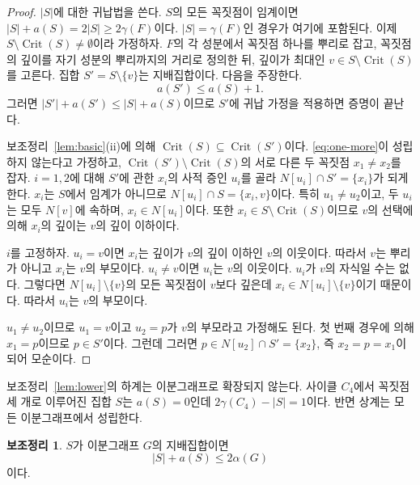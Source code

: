 \documentclass[11pt,a4paper]{article}
\theoremstyle{definition}
\newtheorem{lemma}[theorem]{보조정리}
\newcommand{\Crit}{\operatorname{Crit}}
\begin{document}
\begin{proof}
$|S|$에 대한 귀납법을 쓴다. $S$의 모든 꼭짓점이 임계이면
$|S|+a(S)=2|S|\ge2\gamma(F)$이다. $|S|=\gamma(F)$인 경우가 여기에 포함된다. 이제
$S\setminus\Crit(S)\ne\emptyset$이라 가정하자. $F$의 각 성분에서 꼭짓점 하나를 뿌리로
잡고, 꼭짓점의 깊이를 자기 성분의 뿌리까지의 거리로 정의한 뒤, 깊이가 최대인
$v\in S\setminus\Crit(S)$를 고른다. 집합 $S'=S\setminus\{v\}$는 지배집합이다. 다음을
주장한다.
\begin{equation}\label{eq:one-more}
  a(S')\le a(S)+1 .
\end{equation}
그러면 $|S'|+a(S')\le|S|+a(S)$이므로 $S'$에 귀납 가정을 적용하면 증명이 끝난다.

보조정리~\ref{lem:basic}(ii)에 의해 $\Crit(S)\subseteq\Crit(S')$이다.
\eqref{eq:one-more}이 성립하지 않는다고 가정하고, $\Crit(S')\setminus\Crit(S)$의 서로
다른 두 꼭짓점 $x_1\ne x_2$를 잡자. $i=1,2$에 대해 $S'$에 관한 $x_i$의 사적 증인
$u_i$를 골라 $N[u_i]\cap S'=\{x_i\}$가 되게 한다. $x_i$는 $S$에서 임계가 아니므로
$N[u_i]\cap S=\{x_i,v\}$이다. 특히 $u_1\ne u_2$이고, 두 $u_i$는 모두 $N[v]$에 속하며,
$x_i\in N[u_i]$이다. 또한 $x_i\in S\setminus\Crit(S)$이므로 $v$의 선택에 의해 $x_i$의
깊이는 $v$의 깊이 이하이다.

$i$를 고정하자. $u_i=v$이면 $x_i$는 깊이가 $v$의 깊이 이하인 $v$의 이웃이다. 따라서
$v$는 뿌리가 아니고 $x_i$는 $v$의 부모이다. $u_i\ne v$이면 $u_i$는 $v$의 이웃이다.
$u_i$가 $v$의 자식일 수는 없다. 그렇다면 $N[u_i]\setminus\{v\}$의 모든 꼭짓점이
$v$보다 깊은데 $x_i\in N[u_i]\setminus\{v\}$이기 때문이다. 따라서 $u_i$는 $v$의
부모이다.

$u_1\ne u_2$이므로 $u_1=v$이고 $u_2=p$가 $v$의 부모라고 가정해도 된다. 첫 번째 경우에
의해 $x_1=p$이므로 $p\in S'$이다. 그런데 그러면 $p\in N[u_2]\cap S'=\{x_2\}$, 즉
$x_2=p=x_1$이 되어 모순이다.
\end{proof}

보조정리~\ref{lem:lower}의 하계는 이분그래프로 확장되지 않는다. 사이클 $C_4$에서
꼭짓점 세 개로 이루어진 집합 $S$는 $a(S)=0$인데 $2\gamma(C_4)-|S|=1$이다. 반면 상계는
모든 이분그래프에서 성립한다.

\begin{lemma}\label{lem:upper}
$S$가 이분그래프 $G$의 지배집합이면
\[
  |S|+a(S)\le 2\alpha(G)
\]
이다.
\end{lemma}
\end{document}
